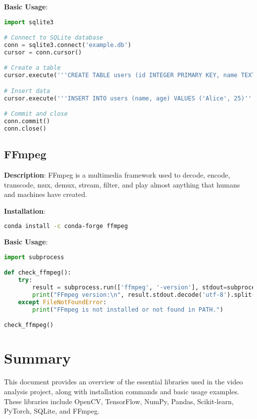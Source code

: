 \documentclass{article}
\begin{document}
\textbf{Basic Usage}:
\begin{lstlisting}[language=python]
import sqlite3

# Connect to SQLite database
conn = sqlite3.connect('example.db')
cursor = conn.cursor()

# Create a table
cursor.execute('''CREATE TABLE users (id INTEGER PRIMARY KEY, name TEXT, age INTEGER)''')

# Insert data
cursor.execute('''INSERT INTO users (name, age) VALUES ('Alice', 25)''')

# Commit and close
conn.commit()
conn.close()
\end{lstlisting}

\subsection{FFmpeg}
\textbf{Description}: FFmpeg is a multimedia framework used to decode, encode, transcode, mux, demux, stream, filter, and play almost anything that humans and machines have created.

\textbf{Installation}:
\begin{lstlisting}[language=bash]
conda install -c conda-forge ffmpeg
\end{lstlisting}

\textbf{Basic Usage}:
\begin{lstlisting}[language=python]
import subprocess

def check_ffmpeg():
    try:
        result = subprocess.run(['ffmpeg', '-version'], stdout=subprocess.PIPE, stderr=subprocess.PIPE)
        print("FFmpeg version:\n", result.stdout.decode('utf-8').split('\n')[0])
    except FileNotFoundError:
        print("FFmpeg is not installed or not found in PATH.")

check_ffmpeg()
\end{lstlisting}

\section{Summary}
This document provides an overview of the essential libraries used in the video analysis project, along with installation commands and basic usage examples. These libraries include OpenCV, TensorFlow, NumPy, Pandas, Scikit-learn, PyTorch, SQLite, and FFmpeg.
\end{document}
